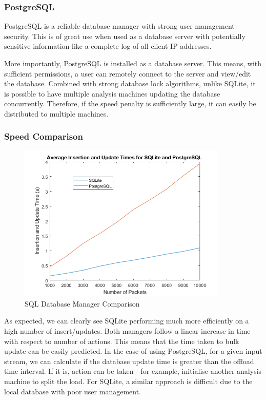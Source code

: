\documentclass[12pt,twoside]{article}
\begin{document}
\subsubsection{PostgreSQL \cite{postresql}}
PostgreSQL is a reliable database manager with strong user management security. This is of great use when used as a database server with potentially sensitive information like a complete log of all client IP addresses. 

More importantly, PostgreSQL is installed as a database server. This means, with sufficient permissions, a user can remotely connect to the server and view/edit the database. Combined with strong database lock algorithms, unlike SQLite, it is possible to have multiple analysis machines updating the database concurrently. Therefore, if the speed penalty is sufficiently large, it can easily be distributed to multiple machines.

\subsubsection{Speed Comparison}


\begin{figure}[h]
	\begin{center}
		\includegraphics[width=10cm]{figures/sql_comparison}
	\end{center}
	\caption{SQL Database Manager Comparison}
	\label{sql_comp} 
\end{figure}

As expected, we can clearly see SQLite performing much more efficiently on a high number of insert/updates. Both managers follow a linear increase in time with respect to number of actions. This means that the time taken to bulk update can be easily predicted. In the case of using PostgreSQL, for a given input stream, we can calculate if the database update time is greater than the offload time interval. If it is, action can be taken - for example, initialise another analysis machine to split the load. For SQLite, a similar approach is difficult due to the local database with poor user management. 
\end{document}
